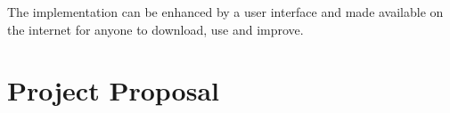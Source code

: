 \documentclass[12pt,notitlepage,twoside]{scrreprt}
\begin{document}
The implementation can be enhanced by a user interface and made available on the internet
for anyone to download, use and improve.

\cleardoublepage



\cleardoublepage

\appendix

\chapter{Project Proposal}
\label{prop}


\end{document}

